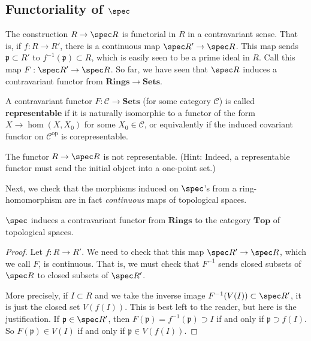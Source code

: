 \subsection{Functoriality of $\spec$}
 The construction $R \to \spec R$ is functorial in $R$ in a
contravariant sense. That is, if $f: R \to R'$, there is a
continuous map $\spec
R' \to \spec R$. This map sends $\mathfrak{p} \subset R'$ to
$f^{-1}(\mathfrak{p}) \subset R$, which is easily seen to be a
prime ideal
in $R$. Call this map $F: \spec R' \to \spec R$. So far, we have
seen that
$\spec R$ induces a contravariant functor from $\mathbf{Rings}
\to \mathbf{Sets}$.

\begin{exercise} 
A contravariant functor $F: \mathcal{C} \to \mathbf{Sets}$ (for
some category
$\mathcal{C}$) is called \textbf{representable} if it is
naturally isomorphic
to a functor of the form $X \to \hom(X, X_0)$ for some $X_0 \in
\mathcal{C}$,
or equivalently if the induced covariant functor on
$\mathcal{C}^{\mathrm{op}}$ is corepresentable. 

The functor $R \to \spec R $ is not representable. (Hint:
Indeed, a representable
functor must send the initial object into a one-point set.)
\end{exercise} 

Next, we check that the morphisms induced on $\spec$'s from a
ring-homomorphism are in fact \emph{continuous} maps of
topological spaces.

\begin{proposition} 
$\spec $ induces a contravariant functor from $\mathbf{Rings}$
to the category
$\mathbf{Top}$ of topological spaces.
\end{proposition} 
\begin{proof} Let $f : R \to R'$. 
We need to check that this map $ \spec R' \to \spec R$, which we
call $F$, is
continuous.
That is, we must check that $F^{-1}$ sends closed
subsets of $\spec R$ to closed subsets of $\spec R'$.  

More precisely, if $I \subset
R$ and we take the inverse image $F^{-1}(V(I)) \subset \spec
R'$, it is just
the closed set $V(f(I))$. This is best left to the reader, but
here is the justification. If $\mathfrak{p} \in \spec R'$, then
$F(\mathfrak{p}) = f^{-1}(\mathfrak{p})
\supset I$ if and only if $\mathfrak{p} \supset f(I)$. So
$F(\mathfrak{p}) \in
V(I)$ if and only if $\mathfrak{p} \in V(f(I))$.

\end{proof} 



